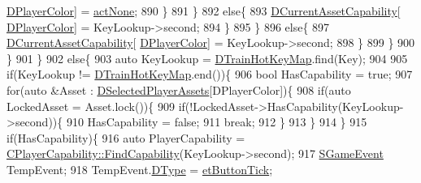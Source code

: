 \begin{DoxyCode}
      \hyperlink{classCApplicationData_a53550939b20cba70570f113e4d1c5d02}{DPlayerColor}] = \hyperlink{GameDataTypes_8h_a35b98ce26aca678b03c6f9f76e4778ceaa8df154ad276f6f62054e9b5b0696f92}{actNone};
890                                 \}
891                             \}
892                             \textcolor{keywordflow}{else}\{ 
893                                 \hyperlink{classCApplicationData_a7e0dbfdc54f73dfa9838ae81b8017e2d}{DCurrentAssetCapability}[
      \hyperlink{classCApplicationData_a53550939b20cba70570f113e4d1c5d02}{DPlayerColor}] = KeyLookup->second;
894                             \}
895                         \}
896                         \textcolor{keywordflow}{else}\{
897                             \hyperlink{classCApplicationData_a7e0dbfdc54f73dfa9838ae81b8017e2d}{DCurrentAssetCapability}[
      \hyperlink{classCApplicationData_a53550939b20cba70570f113e4d1c5d02}{DPlayerColor}] = KeyLookup->second;
898                         \}
899                     \}
900                 \}
901             \}
902             \textcolor{keywordflow}{else}\{
903                 \textcolor{keyword}{auto} KeyLookup = \hyperlink{classCApplicationData_a35798136764b6d2ede555494752e83eb}{DTrainHotKeyMap}.find(Key);
904                 
905                 \textcolor{keywordflow}{if}(KeyLookup != \hyperlink{classCApplicationData_a35798136764b6d2ede555494752e83eb}{DTrainHotKeyMap}.end())\{
906                     \textcolor{keywordtype}{bool} HasCapability = \textcolor{keyword}{true};
907                     \textcolor{keywordflow}{for}(\textcolor{keyword}{auto} &Asset : \hyperlink{classCApplicationData_a05c1087d5a5c4ddc14fcb37444f1642b}{DSelectedPlayerAssets}[DPlayerColor])\{
908                         \textcolor{keywordflow}{if}(\textcolor{keyword}{auto} LockedAsset = Asset.lock())\{   
909                             \textcolor{keywordflow}{if}(!LockedAsset->HasCapability(KeyLookup->second))\{
910                                 HasCapability = \textcolor{keyword}{false};
911                                 \textcolor{keywordflow}{break};
912                             \}
913                         \}
914                     \}
915                     \textcolor{keywordflow}{if}(HasCapability)\{
916                         \textcolor{keyword}{auto} PlayerCapability = 
      \hyperlink{classCPlayerCapability_a881ba4b87385d7cfe5cb6ced2d26f226}{CPlayerCapability::FindCapability}(KeyLookup->second); 
917                         \hyperlink{structSGameEvent}{SGameEvent} TempEvent;
918                         TempEvent.\hyperlink{structSGameEvent_afa10562e243f4ac2b473b655cc58fee7}{DType} = \hyperlink{GameModel_8h_abfcf510bafec7c6429906a6ecaac656dafe7284f9af34794514e5dbfe974e3296}{etButtonTick};

\end{DoxyCode}
